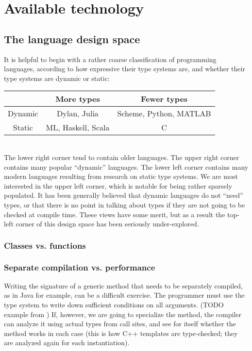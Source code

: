 \chapter{Available technology}


\section{The language design space}

It is helpful to begin with a rather coarse classification of programming
languages, according to how expressive their type systems are, and whether
their type systems are dynamic or static:
\\
\begin{tabular}{|c||c|c|}
\hline 
 & More types & Fewer types\tabularnewline
\hline 
\hline 
Dynamic & Dylan, Julia & Scheme, Python, MATLAB\tabularnewline
\hline 
Static & ML, Haskell, Scala & C\tabularnewline
\hline 
\end{tabular}
\\

The lower right corner tend to contain older languages. The upper right corner
contains many popular ``dynamic'' languages. The lower left corner contains
many modern languages resulting from research on static type systems.
We are most interested in the upper left corner, which is notable for being
rather sparsely populated. It has been generally believed that dynamic
languages do not ``need'' types, or that there is no point in talking about
types if they are not going to be checked at compile time. These views have
some merit, but as a result the top-left corner of this design space has
been seriously under-explored.

\subsection{Classes vs. functions}

\subsection{Separate compilation vs. performance}

Writing the signature of a generic method that needs to be separately compiled,
as in Java for example, can be a difficult exercise.
The programmer must use the type system to write down sufficient conditions on all
arguments.
(TODO example from \cite{Garcia:2003:CSL:949305.949317})
If, however, we are going to specialize the method, the compiler can analyze it
using actual types from call sites, and see for itself whether the method works
in each case (this is how C++ templates are type-checked; they are analyzed
again for each instantiation).

